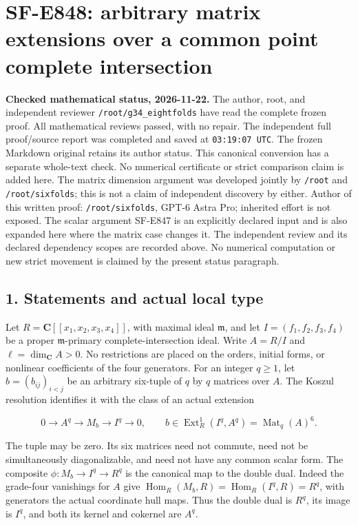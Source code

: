 \section{SF-E848: arbitrary matrix extensions over a common point complete intersection}\label{SF-E848:section}

\textbf{Checked mathematical status, 2026-11-22.} The author, root,
and independent reviewer \texttt{/root/g34\_eightfolds} have read the
complete frozen proof. All mathematical reviews passed, with no repair.
The independent full proof/source report was completed and saved at
\texttt{03:19:07 UTC}. The frozen Markdown original retains its author
status. This canonical conversion has a separate whole-text check.
No numerical certificate or strict comparison claim is added here.
The matrix dimension argument was developed jointly by \texttt{/root} and
\texttt{/root/sixfolds}; this is not a claim of independent discovery by either.
Author of this written proof: \texttt{/root/sixfolds}, GPT-6 Astra Pro; inherited
effort is not exposed. The scalar argument SF-E847 is an explicitly
declared input and is also expanded here where the matrix case changes it.
The independent review and its declared dependency scopes are recorded
above. No numerical computation or new strict movement is claimed by
the present status paragraph.

\subsection{1. Statements and actual local type}\label{SF-E848:s1}

Let \(R=\mathbf C[[x_1,x_2,x_3,x_4]]\), with maximal ideal
\(\mathfrak m\), and let \(I=(f_1,f_2,f_3,f_4)\) be a proper
\(\mathfrak m\)-primary complete-intersection ideal. Write \(A=R/I\)
and \(\ell=\dim_{\mathbf C}A>0\). No restrictions are placed on the
orders, initial forms, or nonlinear coefficients of the four generators.
For an integer \(q\ge1\), let \(b=(b_{ij})_{i<j}\) be an arbitrary
six-tuple of \(q\) by \(q\) matrices over \(A\). The Koszul resolution
identifies it with the class of an actual extension

\[
 0\longrightarrow A^q\longrightarrow M_b\longrightarrow I^q
       \longrightarrow0,
 \qquad
 b\in\operatorname{Ext}^1_R(I^q,A^q)
        =\operatorname{Mat}_q(A)^6.
 \tag{MC.1}
\]

The tuple may be zero. Its six matrices need not commute, need not be
simultaneously diagonalizable, and need not have any common scalar form.
The composite \(\phi:M_b\to I^q\to R^q\) is the canonical map to the
double dual. Indeed the grade-four vanishings for \(A\) give
\(\operatorname{Hom}_R(M_b,R)=\operatorname{Hom}_R(I^q,R)=R^q\),
with generators the actual coordinate hull maps. Thus the double dual
is \(R^q\), its image is \(I^q\), and both its kernel and cokernel are
\(A^q\).

